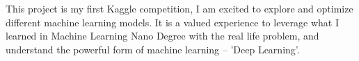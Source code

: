 \documentclass[11pt,oneside,a4paper]{article}
\begin{document}
This project is my first Kaggle competition, I am excited to explore and optimize different machine learning models. It is a valued experience to leverage what I learned in Machine Learning Nano Degree with the real life problem, and understand the powerful form of machine learning -- 'Deep Learning'.


{}







\end{document}
